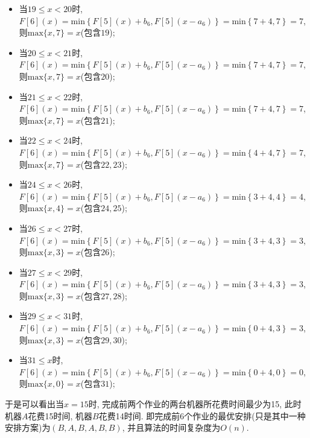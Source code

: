 \documentclass{article}
\begin{document}
\begin{homeworkProblem}
\begin{itemize}
\begin{itemize}
			\item 当$19\leq x<20$时, $F\left[ 6 \right] \left( x \right) =\text{min} \left\{ F\left[ 5 \right] \left( x \right) +b_6,F\left[ 5 \right] \left( x-a_6 \right) \right\} =\text{min} \left\{ 7+4,7 \right\} =7$, 则$\text{max}\{x,7\}=x$(包含$19$);
			\item 当$20\leq x<21$时, $F\left[ 6 \right] \left( x \right) =\text{min} \left\{ F\left[ 5 \right] \left( x \right) +b_6,F\left[ 5 \right] \left( x-a_6 \right) \right\} =\text{min} \left\{ 7+4,7 \right\} =7$, 则$\text{max}\{x,7\}=x$(包含$20$);
			\item 当$21\leq x<22$时, $F\left[ 6 \right] \left( x \right) =\text{min} \left\{ F\left[ 5 \right] \left( x \right) +b_6,F\left[ 5 \right] \left( x-a_6 \right) \right\} =\text{min} \left\{ 7+4,7 \right\} =7$, 则$\text{max}\{x,7\}=x$(包含$21$);
			\item 当$22\leq x<24$时, $F\left[ 6 \right] \left( x \right) =\text{min} \left\{ F\left[ 5 \right] \left( x \right) +b_6,F\left[ 5 \right] \left( x-a_6 \right) \right\} =\text{min} \left\{ 4+4,7 \right\} =7$, 则$\text{max}\{x,7\}=x$(包含$22,23$);
			\item 当$24\leq x<26$时, $F\left[ 6 \right] \left( x \right) =\text{min} \left\{ F\left[ 5 \right] \left( x \right) +b_6,F\left[ 5 \right] \left( x-a_6 \right) \right\} =\text{min} \left\{ 3+4,4 \right\} =4$, 则$\text{max}\{x,4\}=x$(包含$24,25$);
			\item 当$26\leq x<27$时, $F\left[ 6 \right] \left( x \right) =\text{min} \left\{ F\left[ 5 \right] \left( x \right) +b_6,F\left[ 5 \right] \left( x-a_6 \right) \right\} =\text{min} \left\{ 3+4,3 \right\} =3$, 则$\text{max}\{x,3\}=x$(包含$26$);
			\item 当$27\leq x<29$时, $F\left[ 6 \right] \left( x \right) =\text{min} \left\{ F\left[ 5 \right] \left( x \right) +b_6,F\left[ 5 \right] \left( x-a_6 \right) \right\} =\text{min} \left\{ 3+4,3 \right\} =3$, 则$\text{max}\{x,3\}=x$(包含$27,28$);
			\item 当$29\leq x<31$时, $F\left[ 6 \right] \left( x \right) =\text{min} \left\{ F\left[ 5 \right] \left( x \right) +b_6,F\left[ 5 \right] \left( x-a_6 \right) \right\} =\text{min} \left\{ 0+4,3 \right\} =3$, 则$\text{max}\{x,3\}=x$(包含$29,30$);
			\item 当$31\leq x$时, $F\left[ 6 \right] \left( x \right) =\text{min} \left\{ F\left[ 5 \right] \left( x \right) +b_6,F\left[ 5 \right] \left( x-a_6 \right) \right\} =\text{min} \left\{ 0+4,0 \right\} =0$, 则$\text{max}\{x,0\}=x$(包含$31$);
		\end{itemize}
	\end{itemize}
	于是可以看出当$x=15$时, 完成前两个作业的两台机器所花费时间最少为15, 此时机器$A$花费15时间, 机器$B$花费14时间. 即完成前6个作业的最优安排(只是其中一种安排方案)为$\left( B,A,B,A,B,B \right) $, 并且算法的时间复杂度为$O(n)$.
\end{homeworkProblem}
\end{document}
